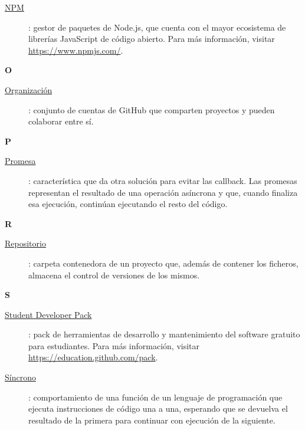 \begin{description}
  \item[\underline{NPM}\label{apend1:npm}]: gestor de paquetes de Node.js, que cuenta con el mayor ecosistema de librerías JavaScript de código abierto. Para más información, visitar {\small \url{https://www.npmjs.com/}}.
  \bigskip
\end{description}

\bigskip
{\bfseries {\Huge O}}\label{Apendice1:O}
\bigskip
\bigskip

\begin{description}
  \item[\underline{Organización}\label{apend1:organizacion}]: conjunto de cuentas de GitHub que comparten proyectos y pueden colaborar entre sí.
  \bigskip
\end{description}

\bigskip
{\bfseries {\Huge P}}\label{Apendice1:P}
\bigskip
\bigskip

\begin{description}
  \item[\underline{Promesa}\label{apend1:promesa}]: característica que da otra solución para evitar las callback. Las promesas representan el resultado de una operación asíncrona y que, cuando finaliza esa ejecución, continúan ejecutando el resto del código.
  \bigskip
\end{description}

\bigskip
{\bfseries {\Huge R}}\label{Apendice1:R}
\bigskip
\bigskip

\begin{description}
  \item[\underline{Repositorio}\label{apend1:repositorio}]: carpeta contenedora de un proyecto que, además de contener los ficheros, almacena el control de versiones de los mismos.
  \bigskip
\end{description}

{\bfseries {\Huge S}}\label{Apendice1:S}
\bigskip
\bigskip

\begin{description}
  \item[\underline{Student Developer Pack}\label{apend1:sdp}]: pack de herramientas de desarrollo y mantenimiento del software gratuito para estudiantes. Para más información, visitar {\small \url{https://education.github.com/pack}}.
  \bigskip
\end{description}

\begin{description}
  \item[\underline{Síncrono}\label{apend1:sincrono}]: comportamiento de una función de un lenguaje de programación que ejecuta instrucciones de código una a una, esperando que se devuelva el resultado de la primera para continuar con ejecución de la siguiente.
  \bigskip
\end{description}

